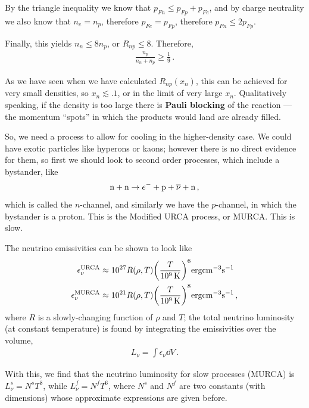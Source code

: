 \documentclass[main.tex]{subfiles}
\begin{document}
By the triangle inequality we know that \(p_{Fn} \leq p_{Fp} + p_{Fe}\), and by charge neutrality we also know that \(n_e = n_p\), therefore  \(p_{Fe} = p_{Fp}\), therefore \(p_{Fn} \leq 2 p_{Fp}\). 

Finally, this yields \(n_n \leq 8 n_p\), or \(R_{np} \leq 8\). Therefore, 
%
\begin{align}
\frac{n_p}{n_n + n_p} \geq \frac{1}{9}
\,.
\end{align}

As we have seen when we have calculated \(R_{np} (x_n)\), this can be achieved for very small densities, so \(x_n \lesssim \num{.1}\), or in the limit of very large \(x_n\).
Qualitatively speaking, if the density is too large there is \textbf{Pauli blocking} of the reaction --- the momentum ``spots'' in which the products would land are already filled. 

So, we need a process to allow for cooling in the higher-density case.
We could have exotic particles like hyperons or kaons; however there is no direct evidence for them, so first we should look to second order processes, which include a bystander, like
%
\begin{align}
\ce{n} + \ce{n} \to e^{-} + \ce{p} + \overline{\nu} + \ce{n}
\,,
\end{align}
%
which is called the \(n\)-channel, and similarly we have the \(p\)-channel, in which the bystander is a proton. 
This is the Modified URCA process, or MURCA. This is slow. 

The neutrino emissivities can be shown to look like
%
\begin{align}
\epsilon _\nu^{\text{URCA}} &\approx \num{e27} R(\rho, T) \qty(\frac{T}{\SI{e9}{K}})^{6} \SI{}{erg cm^{-3} s^{-1}} \\
\epsilon _\nu^{\text{MURCA}} &\approx \num{e21} R(\rho, T) \qty(\frac{T}{\SI{e9}{K}})^{8} \SI{}{erg cm^{-3} s^{-1}}
\,,
\end{align}
%
where \(R\) is a slowly-changing function of \(\rho \) and \(T\); the total neutrino luminosity (at constant temperature) is found by integrating the emissivities over the volume,
%
\begin{align}
L_\nu = \int \epsilon _\nu \dd{V}
\,.
\end{align}

With this, we find that the neutrino luminosity for slow processes (MURCA) is \(L_\nu^{s} = N^{s} T^{8}\), while \(L_\nu^{f} = N^{f} T^{6}\), where \(N^{s}\) and \(N^{f}\) are two constants (with dimensions) whose approximate expressions are given before. 
\end{document}
